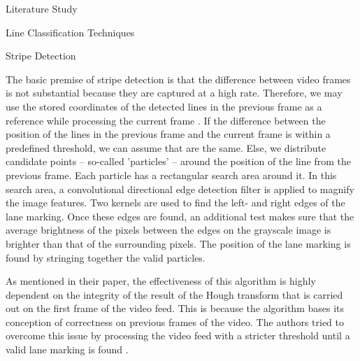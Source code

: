 \documentclass{matthijs}
\begin{document}
\begin{hoofdstuk}{Literature Study}
\begin{paragraaf}{Line Classification Techniques}
\begin{subparagraaf}{Stripe Detection}
				\bigskip

				The basic premise of stripe detection is that the difference between video frames is not substantial because they are captured at a high rate.
				Therefore, we may use the stored coordinates of the detected lines in the previous frame as a reference while processing the current frame \cite{malmir2019design}.
				If the difference between the position of the lines in the previous frame and the current frame is within a predefined threshold, we can assume that are the same.
				Else, we distribute candidate points -- so-called 'particles' -- around the position of the line from the previous frame.
				Each particle has a rectangular search area around it.
				In this search area, a convolutional directional edge detection filter is applied to magnify the image features.
				Two kernels are used to find the left- and right edges of the lane marking.
				Once these edges are found, an additional test makes sure that the average brightness of the pixels between the edges on the grayscale image is brighter than that of the surrounding pixels.
				The position of the lane marking is found by stringing together the valid particles.

				\bigskip

				As mentioned in their paper, the effectiveness of this algorithm is highly dependent on the integrity of the result of the Hough transform that is carried out on the first frame of the video feed.
				This is because the algorithm bases its conception of correctness on previous frames of the video.
				The authors tried to overcome this issue by processing the video feed with a stricter threshold until a valid lane marking is found \cite{malmir2019design}.

			\end{subparagraaf}

		\end{paragraaf}

	\end{hoofdstuk}
	
\end{document}
